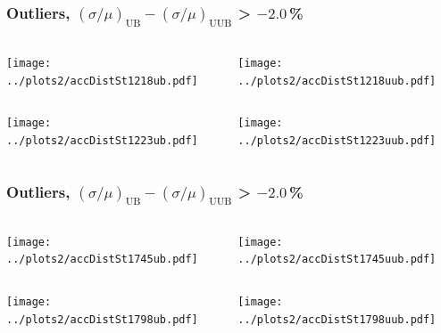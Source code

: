 \documentclass[aspectratio=169]{beamer}
\begin{document}
\begin{frame}
  \frametitle{Outliers, $(\sigma/\mu)_{\mathrm{UB}} -
  (\sigma/\mu)_{\mathrm{UUB}}$ > $-2.0$\,\% }
  \vspace{0.5cm}
  \begin{columns}
    \begin{column}{0.5\textwidth}
      \texttt{[image: ../plots2/accDistSt1218ub.pdf]}
    \end{column}
    \begin{column}{0.5\textwidth}
      \texttt{[image: ../plots2/accDistSt1218uub.pdf]}
    \end{column}
  \end{columns}
  \begin{columns}
    \begin{column}{0.5\textwidth}
      \texttt{[image: ../plots2/accDistSt1223ub.pdf]}
    \end{column}
    \begin{column}{0.5\textwidth}
      \texttt{[image: ../plots2/accDistSt1223uub.pdf]}
    \end{column}
  \end{columns}
\end{frame}

\begin{frame}
  \frametitle{Outliers, $(\sigma/\mu)_{\mathrm{UB}} -
  (\sigma/\mu)_{\mathrm{UUB}}$ > $-2.0$\,\% }
  \vspace{0.5cm}
  \begin{columns}
    \begin{column}{0.5\textwidth}
      \texttt{[image: ../plots2/accDistSt1745ub.pdf]}
    \end{column}
    \begin{column}{0.5\textwidth}
      \texttt{[image: ../plots2/accDistSt1745uub.pdf]}
    \end{column}
  \end{columns}
  \begin{columns}
    \begin{column}{0.5\textwidth}
      \texttt{[image: ../plots2/accDistSt1798ub.pdf]}
    \end{column}
    \begin{column}{0.5\textwidth}
      \texttt{[image: ../plots2/accDistSt1798uub.pdf]}
    \end{column}
  \end{columns}
\end{frame}
\end{document}
